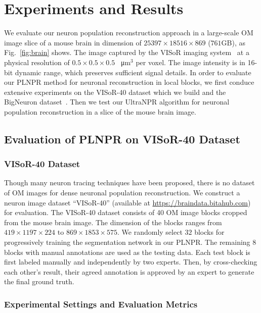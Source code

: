 \section{Experiments and Results}
\label{sec:experiments}

We evaluate our neuron population reconstruction approach in a large-scale OM image slice of a mouse brain in dimension of $25397\times 18516\times 869$ ($761$GB), as Fig.~\ref{fig:brain} shows.
%
The image captured by the VISoR imaging system~\cite{Wang2019} at a physical resolution of $0.5 \times0.5 \times 0.5$ \SI{}{\micro\metre}$^3$ per voxel. 
%
The image intensity is in 16-bit dynamic range, which preserves sufficient signal details.
In order to evaluate our PLNPR method for neuronal reconstruction in local blocks, we first conduce extensive experiments on the VISoR-40 dataset which we build and the BigNeuron dataset~\cite{peng2015}. 
%
Then we test our UltraNPR algorithm for neuronal population reconstruction in a slice of the mouse brain image.

\subsection{Evaluation of PLNPR on VISoR-40 Dataset}
\label{sec:exp_PLNPR_VISoR}

\subsubsection{VISoR-40 Dataset}
Though many neuron tracing techniques have been proposed, there is no dataset of OM images for dense neuronal population reconstruction.
We construct a neuron image dataset ``VISoR-40'' (available at \url{https://braindata.bitahub.com}) for evaluation. 
The VISoR-40 dataset consists of 40 OM image blocks cropped from the mouse brain image. The dimension of the blocks ranges from $419 \times1197 \times 224$ to $869 \times1853 \times 575$.
%
We randomly select $ 32 $ blocks for progressively training the segmentation network in our PLNPR.
%
The remaining 8 blocks with manual annotations are used as the testing data.
Each test block is first labeled manually and independently by two experts. Then, by cross-checking each other's result, their agreed annotation is approved by an expert  to generate the final ground truth.

\subsubsection{Experimental Settings and Evaluation Metrics}


